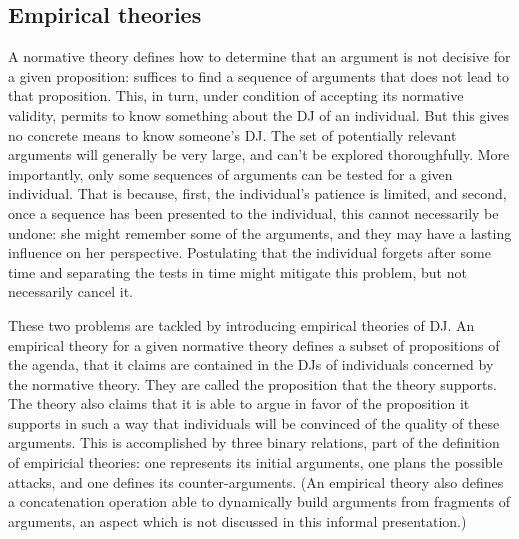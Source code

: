 \documentclass[version=last, pagesize, twoside=off, bibliography=totoc, DIV=calc, fontsize=12pt, a4paper, french, english]{scrartcl}
\begin{document}
\subsection{Empirical theories}
A normative theory defines how to determine that an argument is not decisive for a given proposition: suffices to find a sequence of arguments that does not lead to that proposition. This, in turn, under condition of accepting its normative validity, permits to know something about the \ac{DJ} of an individual. But this gives no concrete means to know someone’s \ac{DJ}. The set of potentially relevant arguments will generally be very large, and can’t be explored thoroughfully. More importantly, only some sequences of arguments can be tested for a given individual. That is because, first, the individual’s patience is limited, and second, once a sequence has been presented to the individual, this cannot necessarily be undone: she might remember some of the arguments, and they may have a lasting influence on her perspective. Postulating that the individual forgets after some time and separating the tests in time might mitigate this problem, but not necessarily cancel it. 


These two problems are tackled by introducing empirical theories of \ac{DJ}. An empirical theory for a given normative theory defines a subset of propositions of the agenda, that it claims are contained in the \acp{DJ} of individuals concerned by the normative theory. They are called the proposition that the theory supports. The theory also claims that it is able to argue in favor of the proposition it supports in such a way that individuals will be convinced of the quality of these arguments. This is accomplished by three binary relations, part of the definition of empiricial theories: one represents its initial arguments, one plans the possible attacks, and one defines its counter-arguments. (An empirical theory also defines a concatenation operation able to dynamically build arguments from fragments of arguments, an aspect which is not discussed in this informal presentation.)
\end{document}
